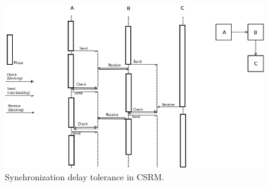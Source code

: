 \begin{figure}
    \centering
    \includegraphics[width=\textwidth,height=\textheight,keepaspectratio]{figures/delay.png}
    \caption{Synchronization delay tolerance in CSRM.}
    \label{fig:delaynoncyclic}
\end{figure}

